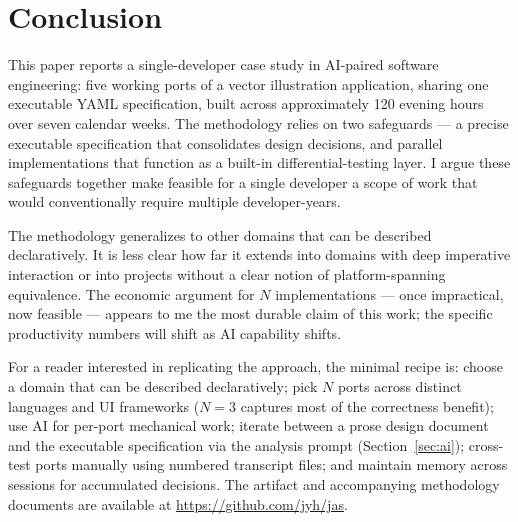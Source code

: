 \documentclass[10pt]{article}
\begin{document}
\section{Conclusion}
\label{sec:conclusion}

This paper reports a single-developer case study in AI-paired software
engineering: five working ports of a vector illustration application,
sharing one executable YAML specification, built across approximately
120 evening hours over seven calendar weeks. The methodology relies on
two safeguards --- a precise executable specification that consolidates
design decisions, and parallel implementations that function as a
built-in differential-testing layer. I argue these safeguards together
make feasible for a single developer a scope of work that would
conventionally require multiple developer-years.

The methodology generalizes to other domains that can be described
declaratively. It is less clear how far it extends into domains with
deep imperative interaction or into projects without a clear notion of
platform-spanning equivalence. The economic argument for $N$
implementations --- once impractical, now feasible --- appears to me the
most durable claim of this work; the specific productivity numbers will
shift as AI capability shifts.

For a reader interested in replicating the approach, the minimal recipe
is: choose a domain that can be described declaratively; pick $N$ ports
across distinct languages and UI frameworks ($N=3$ captures most of the
correctness benefit); use AI for per-port mechanical work; iterate
between a prose design document and the executable specification via the
analysis prompt (Section~\ref{sec:ai}); cross-test ports manually using
numbered transcript files; and maintain memory across sessions for
accumulated decisions. The artifact and accompanying methodology
documents are available at \url{https://github.com/jyh/jas}.



\end{document}
